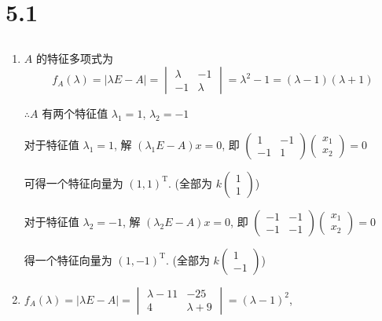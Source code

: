 \section{5.1}
 \subsection{} %
	 \paragraph{} %
		 \begin{enumerate}
			 \item %
			       \( A \) 的特征多项式为
			       \[ f_{A}(\lambda) = |\lambda E - A| = \begin{vmatrix}
					       \lambda & -1      \\
					       -1      & \lambda
				       \end{vmatrix} = \lambda^{2} - 1 = (\lambda - 1)(\lambda + 1) \]

			       \( \therefore A \) 有两个特征值 \( \lambda_{1} = 1 \), \( \lambda_{2} = -1 \)

			       对于特征值 \( \lambda_{1} = 1 \), 解 \( (\lambda_{1}E - A)x = 0 \), 即 \( \begin{pmatrix}
				       1  & -1 \\
				       -1 & 1
			       \end{pmatrix}\begin{pmatrix}
				       x_{1} \\
				       x_{2}
			       \end{pmatrix} = 0 \)

			       可得一个特征向量为 \( (1, 1)^{\mathrm{T}} \). (全部为 \( k\begin{pmatrix}
				       1 \\
				       1
			       \end{pmatrix} \))

			       对于特征值 \( \lambda_{2} = -1 \), 解 \( (\lambda_{2}E - A)x = 0 \), 即 \( \begin{pmatrix}
				       -1 & -1 \\
				       -1 & -1
			       \end{pmatrix}\begin{pmatrix}
				       x_{1} \\
				       x_{2}
			       \end{pmatrix} = 0 \)

			       得一个特征向量为 \( (1, -1)^{\mathrm{T}} \). (全部为 \( k\begin{pmatrix}
				       1 \\
				       -1
			       \end{pmatrix} \))
			 \item %
			       \( f_{A}(\lambda) = |\lambda E - A| = \begin{vmatrix}
				       \lambda - 11 & -25         \\
				       4            & \lambda + 9
			       \end{vmatrix} = (\lambda - 1)^{2} \),


\end{enumerate}
